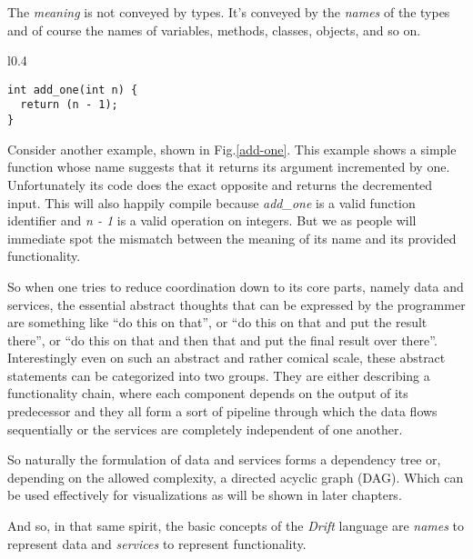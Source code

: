 The \textit{meaning} is not conveyed by types. It's conveyed
by the \textit{names} of the types and of course the names of
variables, methods, classes, objects, and so on.
\newline

\begin{wrapfigure}{l}{0.4\textwidth}
  \begin{lstlisting}
int add_one(int n) {
  return (n - 1);
}
  \end{lstlisting}
  \caption{Example showing a bug that cannot be detected by
           the compiler or type checker.}
  \label{add-one}
\end{wrapfigure}

Consider another example, shown in Fig.\ref{add-one}. This example
shows a simple function whose name suggests that it returns its
argument incremented by one. Unfortunately its code does the exact
opposite and returns the decremented input. This will also
happily compile because \textit{add\_one} is a valid function identifier
and \textit{n - 1} is a valid operation on integers. But we as people
will immediate spot the mismatch between the meaning of its name and
its provided functionality.

So when one tries to reduce coordination down to its core parts,
namely data and services, the essential abstract thoughts that can
be expressed by the programmer are something like ``do this on that'',
or ``do this on that and put the result there'', or ``do this
on that and then that and put the final result over there''.
Interestingly even on such an abstract and rather comical scale,
these abstract statements can be categorized into two groups.
They are either describing a functionality chain, where each
component depends on the output of its predecessor and they
all form a sort of pipeline through which the data flows
sequentially or the services are completely independent of
one another.

So naturally the formulation of data and services forms a
dependency tree or, depending on the allowed complexity,
a directed acyclic graph (DAG). Which can be used effectively
for visualizations as will be shown in later chapters.
\newline

And so, in that same spirit, the basic concepts of the \textit{Drift}
language are \textit{names} to represent data and \textit{services}
to represent functionality.

